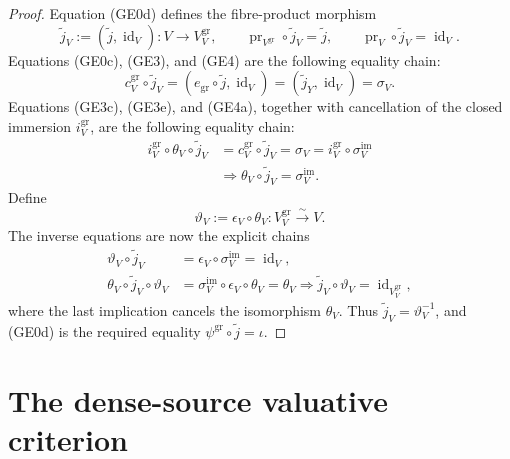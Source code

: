 \begin{proof}
  Equation (GE0d) defines the fibre-product morphism
  \[
    \widetilde j_V:=(\widetilde j,\operatorname{id}_V)
      \colon V\to V^{\mathrm{gr}}_V,\qquad
    \operatorname{pr}_{V^{\mathrm{gr}}}\circ\widetilde j_V
      =\widetilde j,\qquad
    \operatorname{pr}_V\circ\widetilde j_V=\operatorname{id}_V. \tag{GE4}
  \]
  Equations (GE0c), (GE3), and (GE4) are the following equality chain:
  \[
    c_V^{\mathrm{gr}}\circ\widetilde j_V
      =(e_{\mathrm{gr}}\circ\widetilde j,\operatorname{id}_V)
      =(\widetilde j_Y,\operatorname{id}_V)=\sigma_V.           \tag{GE4a}
  \]
  Equations (GE3c), (GE3e), and (GE4a), together with cancellation of the
  closed immersion $i_V^{\mathrm{gr}}$, are the following equality chain:
  \[
  \begin{aligned}
    i_V^{\mathrm{gr}}\circ\theta_V\circ\widetilde j_V
      &=c_V^{\mathrm{gr}}\circ\widetilde j_V
       =\sigma_V
       =i_V^{\mathrm{gr}}\circ\sigma_V^{\mathrm{im}}\\
    &\Longrightarrow
      \theta_V\circ\widetilde j_V=\sigma_V^{\mathrm{im}}.
  \end{aligned}                                                  \tag{GE4b}
  \]
  Define
  \[
    \vartheta_V:=\epsilon_V\circ\theta_V
      \colon V^{\mathrm{gr}}_V\xrightarrow{\sim}V.              \tag{GE4c}
  \]
  The inverse equations are now the explicit chains
  \[
  \begin{aligned}
    \vartheta_V\circ\widetilde j_V
      &=\epsilon_V\circ\sigma_V^{\mathrm{im}}
       =\operatorname{id}_V,\\
    \theta_V\circ\widetilde j_V\circ\vartheta_V
      &=\sigma_V^{\mathrm{im}}\circ\epsilon_V\circ\theta_V
       =\theta_V
      \Longrightarrow
      \widetilde j_V\circ\vartheta_V
       =\operatorname{id}_{V^{\mathrm{gr}}_V},
  \end{aligned}                                                  \tag{GE4d}
  \]
  where the last implication cancels the isomorphism $\theta_V$.  Thus
  $\widetilde j_V=\vartheta_V^{-1}$, and (GE0d) is the required equality
  $\psi^{\mathrm{gr}}\circ\widetilde j=\iota$.
\end{proof}


\section{The dense-source valuative criterion}

